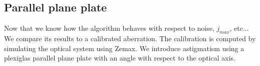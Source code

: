 \newpage
\subsection{Parallel plane plate}
\label{subsec:ParPlanePlate}

Now that we know how the algorithm behaves with respect to noise, $j_{max}$, etc... We compare its results to a calibrated aberration. The calibration is computed by simulating the optical system using Zemax. We introduce astigmatism using a plexiglas  parallel plane plate with an angle with respect to the optical axis.
